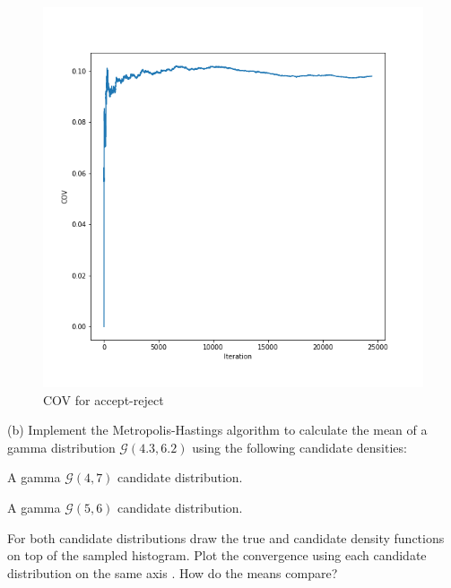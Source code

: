 \documentclass{article}
\begin{document}
\begin{figure}[h!]
\centering
\includegraphics[scale=0.35]{h4p3a2.png}
\caption{ COV for accept-reject}
\end{figure}

\newpage
(b) Implement the Metropolis-Hastings algorithm to calculate the mean of a gamma distribution $\mathcal{G}(4.3,6.2)$ using the following candidate densities:

A gamma $\mathcal{G}(4,7)$ candidate distribution.

A gamma $\mathcal{G}(5,6)$ candidate distribution.

For both candidate distributions draw the true and candidate density functions on top of 
the sampled histogram. Plot the convergence using each candidate distribution on the same axis . How do the means compare?
\end{document}
